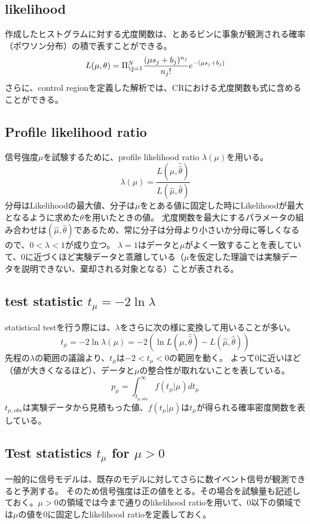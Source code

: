 \documentclass[a4paper,uplatex]{jsreport}
\begin{document}
\subsection{likelihood}
作成したヒストグラムに対する尤度関数は、とあるビンに事象が観測される確率（ポワソン分布）の積で表すことができる。
\begin{equation}
    L(\mu, \theta) = \Pi_{\j=1}^{N} \frac{(\mu s_j + b_j)^{n_j}}{n_j!}e^{-(\mu s_j + b_j)}
\end{equation}
さらに、control regionを定義した解析では、CRにおける尤度関数も式に含めることができる。

\subsection{Profile likelihood ratio}
信号強度$\mu$を試験するために、profile likelihood ratio $\lambda(\mu)$を用いる。
\begin{equation}
  \lambda(\mu) = \frac{L(\mu,\hat{\hat{\theta}})}{L(\hat{\mu},\hat{\theta})}
\end{equation}
分母はLikelihoodの最大値、分子は$\mu$をとある値に固定した時にLikelihoodが最大となるように求めた$\theta$を用いたときの値。
尤度関数を最大にするパラメータの組み合わせは$(\hat{\mu},\hat{\theta})$であるため、常に分子は分母より小さいか分母に等しくなるので、$0<\lambda<1$が成り立つ。
$\lambda=1$はデータと$\mu$がよく一致することを表していて、0に近づくほど実験データと乖離している（$\mu$を仮定した理論では実験データを説明できない、棄却される対象となる）ことが表される。

\subsection{test statistic $t_\mu=-2\ln\lambda$}
statistical testを行う際には、$\lambda$をさらに次の様に変換して用いることが多い。
\begin{equation}
  t_\mu=-2\ln\lambda(\mu) = -2 \left(\ln L(\mu,\hat{\hat{\theta}}) -  L(\hat{\mu},\hat{\theta} ) \right)
\end{equation}
先程の$\lambda$の範囲の議論より、$t_\mu$は$-2<t_\mu<0$の範囲を動く。
よって0に近いほど（値が大きくなるほど）、データと$\mu$の整合性が取れないことを表している。
\begin{equation}
p_\mu = \int_{t_{\mu,obs}} ^{\infty} f(t_\mu|\mu) dt_\mu
\end{equation}
$t_{\mu,obs}$は実験データから見積もった値、$f(t_\mu|\mu)$は$t_\mu$が得られる確率密度関数を表している。

\subsection{Test statistics $t_\mu$ for $\mu > 0$}
一般的に信号モデルは、既存のモデルに対してさらに数イベント信号が観測できると予測する。
そのため信号強度は正の値をとる。その場合を試験量も記述しておく。$\mu>0$の領域では今まで通りのlikelihood ratioを用いて、0以下の領域では$\mu$の値を0に固定したlikelihood ratioを定義しておく。
\end{document}
